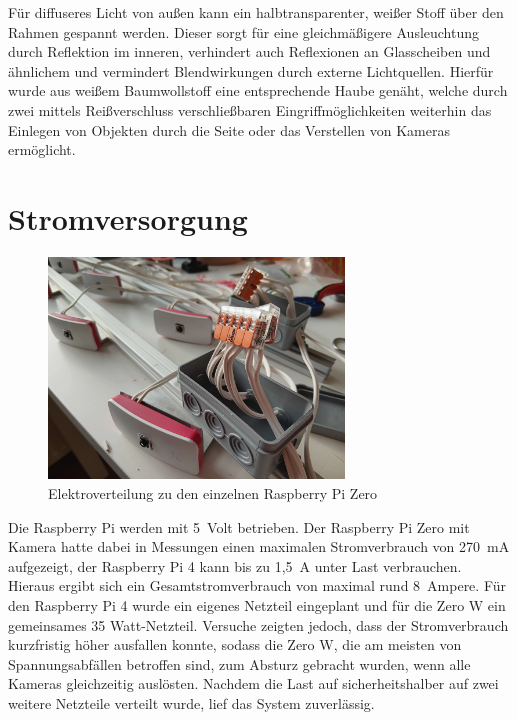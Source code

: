 \documentclass[./00PhotoBox.tex]{subfiles}
\begin{document}
Für diffuseres Licht von außen kann ein halbtransparenter, weißer Stoff über den Rahmen gespannt werden. Dieser sorgt für eine gleichmäßigere Ausleuchtung durch Reflektion im inneren, verhindert auch Reflexionen an Glasscheiben und ähnlichem und vermindert Blendwirkungen durch externe Lichtquellen. Hierfür wurde aus weißem Baumwollstoff eine entsprechende Haube genäht, welche durch zwei mittels Reißverschluss verschließbaren Eingriffmöglichkeiten weiterhin das Einlegen von Objekten durch die Seite oder das Verstellen von Kameras ermöglicht.


\section{Stromversorgung}

\begin{figure}
    \centering
    \includegraphics[width=0.7\textwidth]{./img/stromverteilung.jpg}
    \caption{Elektroverteilung zu den einzelnen Raspberry Pi Zero} %
    \label{img:stromverteilung} %
\end{figure}

Die Raspberry Pi werden mit 5~Volt betrieben. Der Raspberry Pi Zero mit Kamera hatte dabei in Messungen einen maximalen Stromverbrauch von 270~mA aufgezeigt, der Raspberry Pi 4 kann bis zu 1,5~A unter Last verbrauchen. Hieraus ergibt sich ein Gesamtstromverbrauch von maximal rund 8~Ampere. Für den Raspberry Pi 4 wurde ein eigenes Netzteil eingeplant und für die Zero W ein gemeinsames 35 Watt-Netzteil. Versuche zeigten jedoch, dass der Stromverbrauch kurzfristig höher ausfallen konnte, sodass die Zero W, die am meisten von Spannungsabfällen betroffen sind, zum Absturz gebracht wurden, wenn alle Kameras gleichzeitig auslösten. Nachdem die Last auf sicherheitshalber auf zwei weitere Netzteile verteilt wurde, lief das System zuverlässig.
\end{document}

